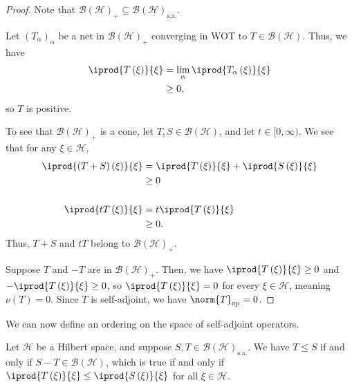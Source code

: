 \documentclass[10pt]{mypackage}
\newcommand{\sa}{\text{s.a.}}
\begin{document}
\begin{proof}
  Note that $\mathcal{B}\left(\mathcal{H}\right)_{+}\subseteq \mathcal{B}\left(\mathcal{H}\right)_{\sa}$.\newline

  Let $\left(T_{\alpha}\right)_{\alpha}$ be a net in $\mathcal{B}\left(\mathcal{H}\right)_{+}$ converging in WOT to $T\in \mathcal{B}\left(\mathcal{H}\right)$. Thus, we have
  \begin{align*}
    \iprod{T\left(\xi\right)}{\xi} &= \lim_{\alpha} \iprod{T_{\alpha}\left(\xi\right)}{\xi}\\
                                   &\geq 0,
  \end{align*}
  so $T$ is positive.\newline

  To see that $\mathcal{B}\left(\mathcal{H}\right)_{+}$ is a cone, let $T,S\in \mathcal{B}\left(\mathcal{H}\right)$, and let $t\in [0,\infty)$. We see that for any $\xi\in \mathcal{H}$,
  \begin{align*}
    \iprod{\left(T+S\right)\left(\xi\right)}{\xi} &= \iprod{T\left(\xi\right)}{\xi} + \iprod{S\left(\xi\right)}{\xi}\\
                                                  &\geq 0\\
                                                  \\
    \iprod{tT\left(\xi\right)}{\xi} &= t \iprod{T\left(\xi\right)}{\xi}\\
                                    &\geq 0.
  \end{align*}
  Thus, $T+S$ and $tT$ belong to $\mathcal{B}\left(\mathcal{H}\right)_{+}$.\newline

  Suppose $T$ and $-T$ are in $\mathcal{B}\left(\mathcal{H}\right)_{+}$. Then, we have $ \iprod{T\left(\xi\right)}{\xi} \geq 0 $ and $ - \iprod{T\left(\xi\right)}{\xi} \geq 0 $, so $ \iprod{T\left(\xi\right)}{\xi} = 0 $ for every $\xi \in \mathcal{H}$, meaning $\nu\left(T\right) = 0$. Since $T$ is self-adjoint, we have $\norm{T}_{\text{op}} = 0$.
\end{proof}
We can now define an ordering on the space of self-adjoint operators.
\begin{definition}
  Let $\mathcal{H}$ be a Hilbert space, and suppose $S,T\in \mathcal{B}\left(\mathcal{H}\right)_{\sa}$. We have $T\leq S$ if and only if $S-T\in \mathcal{B}\left(\mathcal{H}\right)$, which is true if and only if $ \iprod{T\left(\xi\right)}{\xi} \leq \iprod{S\left(\xi\right)}{\xi} $ for all $\xi \in \mathcal{H}$.
\end{definition}
\end{document}
